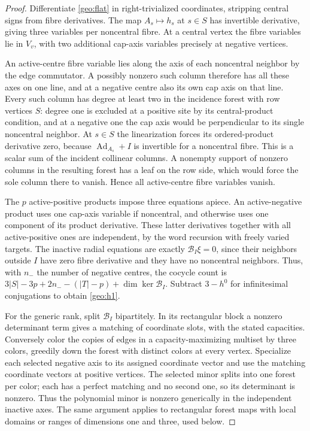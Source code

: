 \begin{proof}
Differentiate \eqref{geo:flat} in right-trivialized coordinates, stripping central signs from fibre derivatives. The map \(A_s\mapsto h_s\) at \(s\in S\) has invertible derivative, giving three variables per noncentral fibre. At a central vertex the fibre variables lie in \(V_v\), with two additional cap-axis variables precisely at negative vertices.

An active-centre fibre variable lies along the axis of each noncentral neighbor by the edge commutator. A possibly nonzero such column therefore has all these axes on one line, and at a negative centre also its own cap axis on that line. Every such column has degree at least two in the incidence forest with row vertices \(S\): degree one is excluded at a positive site by its central-product condition, and at a negative one the cap axis would be perpendicular to its single noncentral neighbor. At \(s\in S\) the linearization forces its ordered-product derivative zero, because \(\operatorname{Ad}_{A_s}+I\) is invertible for a noncentral fibre. This is a scalar sum of the incident collinear columns. A nonempty support of nonzero columns in the resulting forest has a leaf on the row side, which would force the sole column there to vanish. Hence all active-centre fibre variables vanish.

The \(p\) active-positive products impose three equations apiece. An active-negative product uses one cap-axis variable if noncentral, and otherwise uses one component of its product derivative. These latter derivatives together with all active-positive ones are independent, by the word recursion with freely varied targets. The inactive radial equations are exactly \(\mathcal B_I\xi=0\), since their neighbors outside \(I\) have zero fibre derivative and they have no noncentral neighbors. Thus, with \(n_-\) the number of negative centres, the cocycle count is \(3|S|-3p+2n_--(|T|-p)+\dim\ker\mathcal B_I\). Subtract \(3-h^0\) for infinitesimal conjugations to obtain \eqref{geo:h1}.

For the generic rank, split \(\mathcal B_I\) bipartitely. In its rectangular block a nonzero determinant term gives a matching of coordinate slots, with the stated capacities. Conversely color the copies of edges in a capacity-maximizing multiset by three colors, greedily down the forest with distinct colors at every vertex. Specialize each selected negative axis to its assigned coordinate vector and use the matching coordinate vectors at positive vertices. The selected minor splits into one forest per color; each has a perfect matching and no second one, so its determinant is nonzero. Thus the polynomial minor is nonzero generically in the independent inactive axes. The same argument applies to rectangular forest maps with local domains or ranges of dimensions one and three, used below.
\end{proof}

